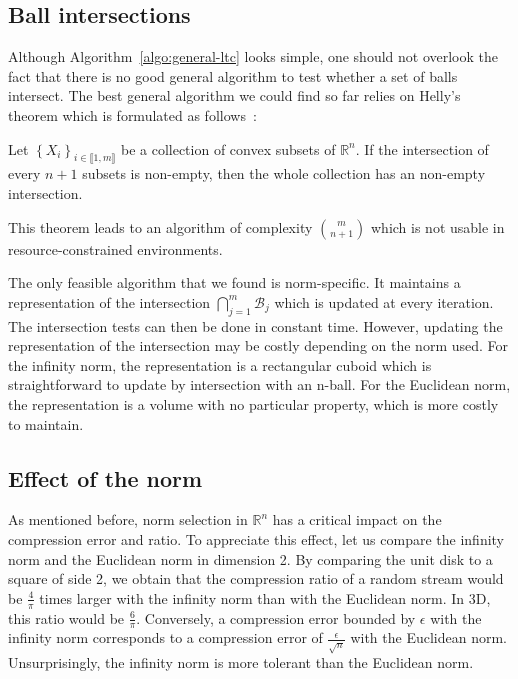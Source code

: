 \documentclass{report}
\begin{document}
\subsection{Ball intersections}

Although Algorithm~\ref{algo:general-ltc} looks simple, one should not
overlook the fact that there is no good general algorithm to test
whether a set of balls intersect. The best general algorithm we could find
so far relies on Helly's theorem which is formulated as follows~\cite{helly1923mengen}:
\begin{theorem}
Let $\left\{ X_i \right\}_{i \in \llbracket 1, m \rrbracket}$ be a collection of convex subsets of $\mathbb{R}^n$. If the intersection of every $n+1$
subsets is non-empty, then the whole collection has an non-empty intersection.
\end{theorem}
\noindent This theorem leads to an algorithm of complexity ${m \choose n+1}$ which is
not usable in resource-constrained environments.

The only feasible algorithm that we found is norm-specific. It
maintains a representation of the intersection
$\bigcap_{j=1}^{m}{\mathcal{B}_j}$ which is updated at every iteration.
The intersection tests can then be done in constant time. However,
updating the representation of the intersection may be costly
depending on the norm used. For the infinity norm, the representation
is a rectangular cuboid which is straightforward to update by
intersection with an n-ball.
For the Euclidean norm, the representation is a volume with no particular property,
which is more costly to maintain.

\subsection{Effect of the norm}

As mentioned before, norm selection in $\mathbb{R}^n$ has a critical
impact on the compression error and ratio. To appreciate this effect,
let us compare the infinity norm and the
Euclidean norm in dimension 2. By comparing the unit disk to a
square of side 2, we obtain that the compression ratio of a random stream would
be $\frac{4}{\pi}$ times larger with the infinity norm than with the 
Euclidean norm. In 3D, this ratio would be $\frac{6}{\pi}$. Conversely, 
a compression error bounded by $\epsilon$ with the infinity norm 
corresponds to a compression error of $\frac{\epsilon}{\sqrt{n}}$ with 
the Euclidean norm. Unsurprisingly, the
infinity norm is more tolerant than the Euclidean norm.
\end{document}
